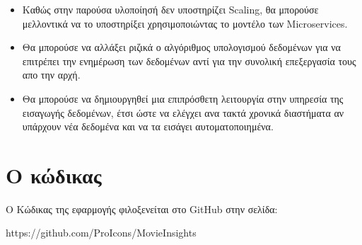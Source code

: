 \begin{itemize}
    \item Καθώς στην παρούσα υλοποίησή δεν υποστηρίζει Scaling, θα μπορούσε μελλοντικά να το υποστηρίξει χρησιμοποιώντας το μοντέλο των Microservices. 
    \item Θα μπορούσε να αλλάξει ριζικά ο αλγόριθμος υπολογισμού δεδομένων για να επιτρέπει την ενημέρωση των δεδομένων αντί για την συνολική επεξεργασία τους απο την αρχή.
    \item Θα μπορούσε να δημιουργηθεί μια επιπρόσθετη λειτουργία στην υπηρεσία της εισαγωγής δεδομένων, έτσι ώστε να ελέγχει ανα τακτά χρονικά διαστήματα αν υπάρχουν νέα δεδομένα και να τα εισάγει αυτοματοποιημένα.
\end{itemize}

\section{Ο κώδικας}
Ο Κώδικας της εφαρμογής φιλοξενείται στο GitHub στην σελίδα: 

https://github.com/ProIcons/MovieInsights
